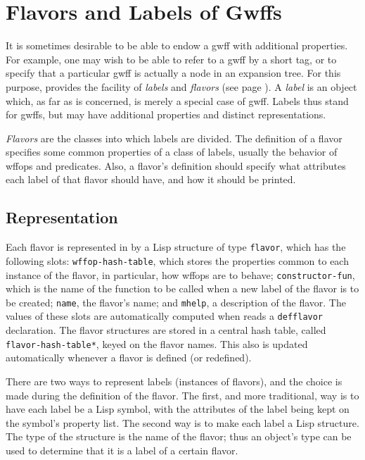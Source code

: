\section{Flavors and Labels of Gwffs}
\label{defflavors}
\label{labels}

It is sometimes desirable to be able to endow a gwff with additional
properties.  For example, one may wish to be able to refer to a
gwff by a short tag, or to specify that a particular gwff is actually
a node in an expansion tree.  For this purpose, \TPS provides the
facility of {\it labels} and {\it flavors} (see page \pageref{flavors}).  
A {\it label} is an object which, as far as \TPS is concerned, is merely
a special case of gwff. Labels thus stand for gwffs, but may have
additional properties and distinct representations.

{\it Flavors} are the classes into which labels are divided.  The definition
of a flavor specifies some common properties of a class
of labels, usually the behavior of wffops and predicates.  Also, a 
flavor's definition should specify what attributes each label of that 
flavor should have, and how it should be printed.

\subsection{Representation}

Each flavor is represented in \TPS by a Lisp structure of type {\tt flavor}, 
which has the following slots: {\tt wffop-hash-table}, which stores the
properties common to each instance of the flavor, in particular, how
wffops are to behave; {\tt constructor-fun}, which
is the name of the function to be called when a new label of the flavor
is to be created; {\tt name}, the flavor's name; and {\tt mhelp}, a description
of the flavor.  The values of these slots are automatically computed when
\TPS reads a {\tt defflavor} declaration.
The flavor structures are stored in a central hash table, called
{\tt *flavor-hash-table*}, keyed on the flavor names.  This also is 
updated automatically whenever a flavor is defined (or redefined).

There are two ways to represent labels (instances of flavors), and the
choice is made during the definition of the flavor.  The first, and more
traditional, way is to have each label be a Lisp symbol, with the attributes
of the label being kept on the symbol's property list.  
The second way is to make each label a Lisp structure.  The type of the
structure is the name of the flavor; thus an object's type can be used to
determine that it is a label of a certain flavor.

